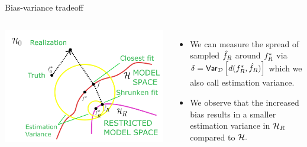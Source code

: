 \documentclass[11pt,compress,t,notes=noshow, xcolor=table]{beamer}
\begin{document}
\begin{vbframe}{Bias-variance tradeoff}
\begin{columns}[onlytextwidth,T]
  \includegraphics[width=1.0\textwidth]{figure_man/bv_anim_2.pdf}

      \lz 
      \begin{itemize}
          \item We can measure the spread of sampled $\hat{f}_R$ around $f^{\ast}_R$ via $\delta = \mathsf{Var}_{\mathcal{D}}\left[d(f^{\ast}_R, \hat{f}_R)\right]$ which we also call estimation variance.
          \item We observe that the increased bias results in a smaller estimation variance in $\mathcal{H}_R$ compared to $\mathcal{H}.$
      \end{itemize}
    \end{columns}

\end{vbframe}



\endlecture
\end{document}
